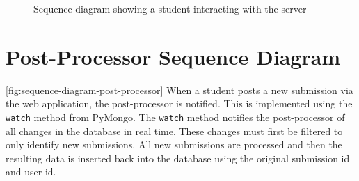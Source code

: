 \vspace*{\fill}

\begin{figure}[H]
  \centering
  \caption[Student-server sequence diagram]{Sequence diagram showing a student interacting with the server}
  \label{fig:sequence-diagram-student-server}
\end{figure}

\vspace*{\fill}

\newpage

\section{Post-Processor Sequence Diagram}
\autoref{fig:sequence-diagram-post-processor} When a student posts a new submission via the web application, the post-processor is notified. This is implemented using the \texttt{watch} method from PyMongo. The \texttt{watch} method notifies the post-processor of all changes in the database in real time. These changes must first be filtered to only identify new submissions. All new submissions are processed and then the resulting data is inserted back into the database using the original submission id and user id.

\vspace*{\fill}

